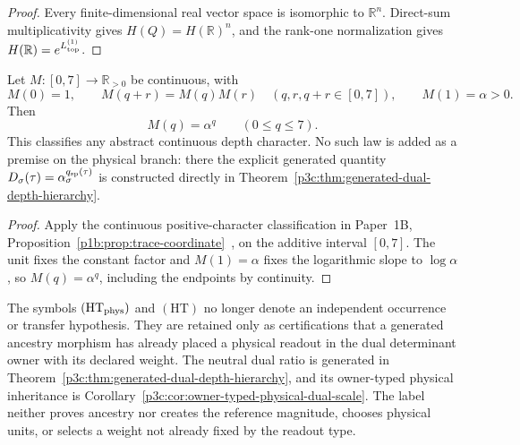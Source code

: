 \documentclass[12pt,a4paper]{article}
\begin{document}
\begin{proof}
Every finite-dimensional real vector space is isomorphic to \(\mathbb R^n\).
Direct-sum multiplicativity gives
\(H(Q)=H(\mathbb R)^n\), and the rank-one normalization gives
\(H(\mathbb R)=e^{L_{\rm top}^{(1)}}\).
\end{proof}

\begin{theorem}
\label{p3c:thm:continuous-depth-character}
Let \(M:[0,7]\to\mathbb R_{>0}\) be continuous, with
\[
 M(0)=1,\qquad
 M(q+r)=M(q)M(r)
 \quad(q,r,q+r\in[0,7]),
 \qquad M(1)=\alpha>0.
\]
Then
\[
 \boxed{M(q)=\alpha^q\qquad(0\le q\le7).}
\]
This classifies any abstract continuous depth character.  No such law is
added as a premise on the physical branch: there the explicit generated
quantity \(D_\sigma(\tau)=
\alpha_\sigma^{q_{\rm sp}(\tau)}\) is constructed directly in
Theorem~\ref{p3c:thm:generated-dual-depth-hierarchy}.
\end{theorem}

\begin{proof}
Apply the continuous positive-character classification in Paper~1B,
Proposition~\ref{p1b:prop:trace-coordinate}~\cite{Kugelmann2026Paper1B},
on the additive interval \([0,7]\).  The unit fixes the constant factor
and \(M(1)=\alpha\) fixes the logarithmic slope to \(\log\alpha\),
so \(M(q)=\alpha^q\), including the endpoints by continuity.
\end{proof}

\begin{definition}
\label{p3:def:contact-to-scale-transfer}
The symbols \((\mathrm{HT}_{\rm phys})\) and \((\mathrm{HT})\) no longer
denote an independent occurrence or transfer hypothesis.  They are retained
only as certifications that a generated ancestry morphism has already
placed a physical readout in the dual determinant owner with its declared
weight.  The neutral dual ratio is generated in
Theorem~\ref{p3c:thm:generated-dual-depth-hierarchy}, and its owner-typed
physical inheritance is Corollary~\ref{p3c:cor:owner-typed-physical-dual-scale}.
The label neither proves ancestry nor creates the reference magnitude, chooses
physical units, or selects a weight not already fixed by the readout type.
\end{definition}
\end{document}
